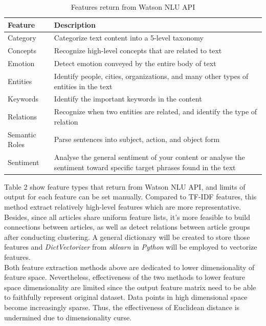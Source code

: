 \documentclass[12pt]{article}
\begin{document}
\begin{table}[h]
\centering
    \begin{tabular}{ | p{3cm}<{\centering} | p{10.5cm}<{\centering}|}
    \hline
    \textbf{Feature}           & \textbf{Description}                                                                             \\ \hline  
    Category          & Categorize text content into a 5-level taxonomy                                                 \\ \hline  
    Concepts          & Recognize high-level concepts that are related to text                                       \\  \hline  
    Emotion     &   Detect emotion conveyed by the entire body of text \\   \hline  
    Entities  &  Identify people, cities, organizations, and many other types of entities in the text                        \\  \hline
    Keywords  &       Identify the important keywords in the content    \\  \hline
    Relations &  Recognize when two entities are related, and identify the type of relation \\ \hline
    Semantic Roles &  Parse sentences into subject, action, and object form \\ \hline
    Sentiment & Analyse the general sentiment of your content or analyse the sentiment toward specific target phrases found in the text \\ \hline
    \end{tabular}
    \caption {Features return from Watson NLU API}
\end{table}  
Table 2 show feature types that return from Watson NLU API, and limits of output for each feature can be set manually. Compared to TF-IDF features, this method extract relatively high-level features which are more representative. Besides, since all articles share uniform feature lists, it's more feasible to build connections between articles, as well as detect relations between article groups after conducting clustering.  A general dictionary will be created to store those features and \textit{DictVectorizer} from \textit{sklearn} in \textit{Python} will be employed to vectorize features.\\
Both feature extraction methods above are dedicated to lower dimensionality of feature space. Nevertheless, effectiveness of the two methods to lower feature space dimensionality are limited since the output feature matrix need to be able to faithfully represent original dataset. Data points in high dimensional space become increasingly sparse. Thus, the effectiveness of Euclidean distance is undermined due to dimensionality curse. \\ 
\end{document}
